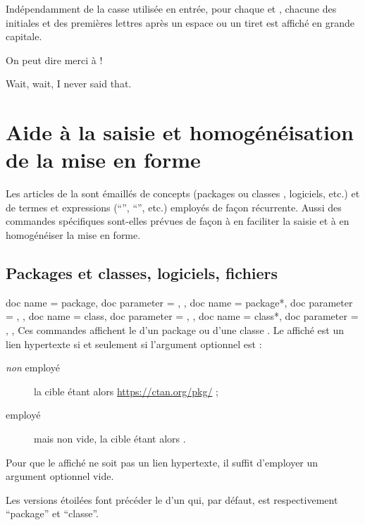 \documentclass{letgut}
\begin{document}
Indépendamment de la casse utilisée en entrée, pour chaque  et
, chacune des initiales et des premières lettres après un espace ou
un tiret est affiché en grande capitale.

\begin{ltx-code-result}[title addon=personnes]
On peut dire merci à
 !
\end{ltx-code-result}

\begin{ltx-code-result}[title addon=auteur,listing options app={deletekeywords={[3]{author}}}]
\begin{displayquote} %
  Wait, wait, I never said that.
  \author{knuth, dONALD e.}
\end{displayquote}
\end{ltx-code-result}

\section{Aide à la saisie et homogénéisation de la mise en forme}
\label{sec:aide-la-saisie}

Les articles de la  sont émaillés de concepts (packages ou classes
, logiciels, etc.) et de termes et expressions
(\enquote{\gut{}}, \enquote{}, etc.) employés de façon
récurrente. Aussi des commandes spécifiques sont-elles prévues de façon à en
faciliter la saisie et à en homogénéiser la mise en forme.

\subsection{Packages et classes, logiciels, fichiers}
\label{sec:classes-packages-et}

\begin{docCommands}
  {
    {
      doc name = package,
      doc parameter = ,
    },
    {
      doc name = package*,
      doc parameter = ,
    },
    {
      doc name = class,
      doc parameter = ,
    },
    {
      doc name = class*,
      doc parameter = ,
    },
  }
  Ces commandes affichent le  d'un package ou d'une classe
  . Le  affiché est un lien hypertexte si et seulement
  si l'argument optionnel est :
  \begin{description}
  \item[\emph{non} employé] la cible étant alors
    \url{https://ctan.org/pkg/} ;
  \item[ employé] mais non vide, la cible étant alors
    .
  \end{description}
  Pour que le  affiché ne soit pas un lien hypertexte, il suffit
  d'employer un argument optionnel vide.

  Les versions étoilées font précéder le  d'un  qui, par
  défaut, est respectivement \enquote{package} et \enquote{classe}.
\end{docCommands}
\end{document}
